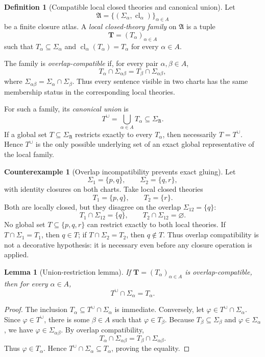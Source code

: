 \documentclass[11pt]{amsart}
\numberwithin{equation}{section}
\theoremstyle{plain}
\newtheorem{lemma}[theorem]{Lemma}
\theoremstyle{definition}
\newtheorem{definition}[theorem]{Definition}
\newtheorem{counterexample}[theorem]{Counterexample}
\theoremstyle{remark}
\newcommand{\Cl}{\operatorname{cl}}
\newcommand{\A}{\mathfrak A}
\newcommand{\Sig}{\Sigma}
\newcommand{\Tcup}{T^{\cup}}
\begin{document}
\begin{definition}[Compatible local closed theories and canonical union]
Let
\[
  \A=\{(\Sig_\alpha,\Cl_\alpha)\}_{\alpha\in A}
\]
be a finite closure atlas.  A \emph{local closed-theory family} on \(\A\) is a tuple
\[
  \mathbf T=(T_\alpha)_{\alpha\in A}
\]
such that \(T_\alpha\subseteq\Sig_\alpha\) and \(\Cl_\alpha(T_\alpha)=T_\alpha\) for every \(\alpha\in A\).

The family is \emph{overlap-compatible} if, for every pair \(\alpha,\beta\in A\),
\[
  T_\alpha\cap\Sig_{\alpha\beta}
  =
  T_\beta\cap\Sig_{\alpha\beta},
\]
where \(\Sig_{\alpha\beta}=\Sig_\alpha\cap\Sig_\beta\).  Thus every sentence visible in two charts has the same membership status in the corresponding local theories.

For such a family, its \emph{canonical union} is
\[
  \Tcup=\bigcup_{\alpha\in A}T_\alpha\subseteq\Sig_{\A}.
\]
If a global set \(T\subseteq\Sig_{\A}\) restricts exactly to every \(T_\alpha\), then necessarily \(T=\Tcup\).  Hence \(\Tcup\) is the only possible underlying set of an exact global representative of the local family.
\end{definition}

\begin{counterexample}[Overlap incompatibility prevents exact gluing]
\label{cex:overlap-incompatibility-prevents-gluing}
Let
\[
  \Sig_1=\{p,q\},
  \qquad
  \Sig_2=\{q,r\},
\]
with identity closures on both charts.  Take local closed theories
\[
  T_1=\{p,q\},
  \qquad
  T_2=\{r\}.
\]
Both are locally closed, but they disagree on the overlap \(\Sig_{12}=\{q\}\):
\[
  T_1\cap\Sig_{12}=\{q\},
  \qquad
  T_2\cap\Sig_{12}=\varnothing.
\]
No global set \(T\subseteq\{p,q,r\}\) can restrict exactly to both local theories.  If \(T\cap\Sig_1=T_1\), then \(q\in T\); if \(T\cap\Sig_2=T_2\), then \(q\notin T\).  Thus overlap compatibility is not a decorative hypothesis: it is necessary even before any closure operation is applied.
\end{counterexample}


\begin{lemma}[Union-restriction lemma]
\label{lem:union-restriction}
If \(\mathbf T=(T_\alpha)_{\alpha\in A}\) is overlap-compatible, then for every \(\alpha\in A\),
\[
  \Tcup\cap\Sig_\alpha=T_\alpha.
\]
\end{lemma}

\begin{proof}
The inclusion \(T_\alpha\subseteq\Tcup\cap\Sig_\alpha\) is immediate.  Conversely, let \(\varphi\in\Tcup\cap\Sig_\alpha\).  Since \(\varphi\in\Tcup\), there is some \(\beta\in A\) such that \(\varphi\in T_\beta\).  Because \(T_\beta\subseteq\Sig_\beta\) and \(\varphi\in\Sig_\alpha\), we have \(\varphi\in\Sig_{\alpha\beta}\).  By overlap compatibility,
\[
  T_\alpha\cap\Sig_{\alpha\beta}
  =
  T_\beta\cap\Sig_{\alpha\beta}.
\]
Thus \(\varphi\in T_\alpha\).  Hence \(\Tcup\cap\Sig_\alpha\subseteq T_\alpha\), proving the equality.
\end{proof}
\end{document}
